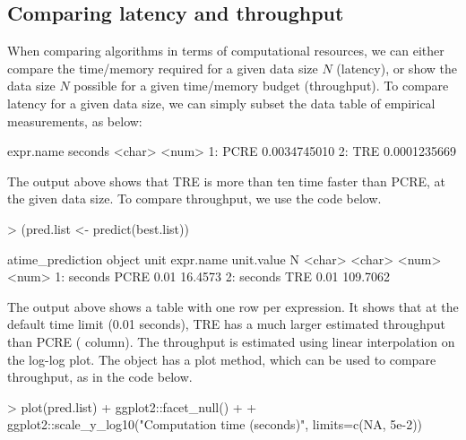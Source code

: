 \subsection{Comparing latency and throughput}

When comparing algorithms in terms of computational resources, we can either compare the time/memory required for a given data size $N$ (latency), or show the data size $N$ possible for a given time/memory budget (throughput).
To compare latency for a given data size, we can simply subset the data table of empirical measurements, as below:
\begin{Schunk}
\begin{Soutput}
   expr.name      seconds
      <char>        <num>
1:      PCRE 0.0034745010
2:       TRE 0.0001235669
\end{Soutput}
\end{Schunk}
The output above shows that TRE is more than ten time faster than PCRE, at the given data size.
To compare throughput, we use the code below.
\begin{Schunk}
\begin{Sinput}
> (pred.list <- predict(best.list))
\end{Sinput}
\begin{Soutput}
atime_prediction object
      unit expr.name unit.value        N
    <char>    <char>      <num>    <num>
1: seconds      PCRE       0.01  16.4573
2: seconds       TRE       0.01 109.7062
\end{Soutput}
\end{Schunk}
The output above shows a table with one row per expression. 
It shows that at the default time limit (0.01 seconds), TRE has a much larger estimated throughput than PCRE ( column). 
The throughput is estimated using linear interpolation on the log-log plot.
The  object has a plot method, which can be used to compare throughput, as in the code below.
\begin{Schunk}
\begin{Sinput}
> plot(pred.list) + ggplot2::facet_null() +
+   ggplot2::scale_y_log10("Computation time (seconds)", limits=c(NA, 5e-2))
\end{Sinput}
\end{Schunk}
